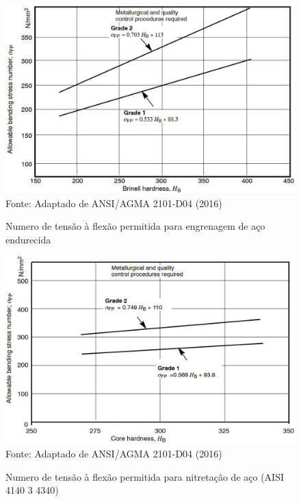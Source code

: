 \documentclass[12pt,a4paper]{article}
\begin{document}
\begin{figure}[!htb]
    \centering
    \caption{Numero de tensão à flexão permitida para engrenagem de aço endurecida}
    \includegraphics[scale=0.46]{Imagens/Img28.png}\\
    {\footnotesize Fonte: Adaptado de ANSI/AGMA 2101-D04 (2016)}
    \label{fig:28}
\end{figure}

\begin{figure}[!htb]
    \centering
    \caption{Numero de tensão à flexão permitida para nitretação de aço (AISI 4140 3 4340)}
    \includegraphics[scale=0.46]{Imagens/Img29.png}\\
    {\footnotesize Fonte: Adaptado de ANSI/AGMA 2101-D04 (2016)}
    \label{fig:29}
\end{figure}
\end{document}
